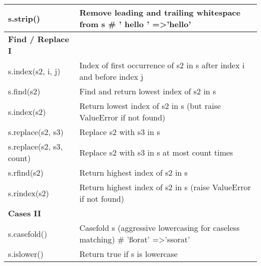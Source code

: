 \documentclass[a4paper,11pt]{book}
\numberwithin{figure}{chapter}
\numberwithin{table}{chapter}
\begin{document}
\begin{appendices}
\begin{table}[!htbp]
\begin{tabular}{lp{12cm}}
s.strip()                & Remove leading and trailing whitespace from s \# ' hello ' =\textgreater 'hello'                                                                \\ \midrule
\textbf{Find / Replace I}         &                                                                                                                                                 \\ \midrule
s.index(s2, i, j)        & Index of first occurrence of s2 in s after index i and before index j                                                                           \\
s.find(s2)               & Find and return lowest index of s2 in s                                                                                                         \\
s.index(s2)              & Return lowest index of s2 in s (but raise ValueError if not found)                                                                              \\
s.replace(s2, s3)        & Replace s2 with s3 in s                                                                                                                         \\
s.replace(s2, s3, count) & Replace s2 with s3 in s at most count times                                                                                                     \\
s.rfind(s2)              & Return highest index of s2 in s                                                                                                                 \\
s.rindex(s2)             & Return highest index of s2 in s (raise ValueError if not found)                                                                                 \\ \midrule
\textbf{Cases II}                 &                                                                                                                                                 \\ \midrule
s.casefold()             & Casefold s (aggressive lowercasing for caseless matching) \# 'ßorat' =\textgreater 'ssorat'                                                     \\
s.islower()              & Return true if s is lowercase                                                                                                                   \\

\end{tabular}
\end{table}
\end{appendices}
\end{document}
